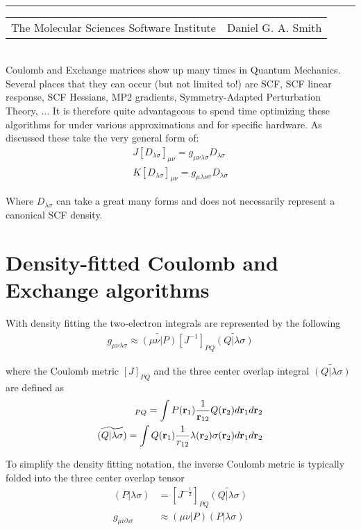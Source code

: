 \documentclass[aip,jcp,preprint,superscriptaddress,floatfix]{revtex4-1}
\renewcommand{\title}[1]{\textbf{\large{#1}}\\}
\newcommand{\leftright}[2]{\begin{tabularx}{\textwidth}{X>{\raggedleft}X}#1%
& #2\\\end{tabularx}\\[-1cm]}
\begin{document}
\title{}
\rule{\textwidth}{1pt}
\leftright{The Molecular Sciences Software Institute}{Daniel G. A. Smith} %

\bigskip
Coulomb and Exchange matrices show up many times in Quantum Mechanics. Several places that they can occur (but not limited to!) are SCF, SCF linear response, SCF Hessians, MP2 gradients, Symmetry-Adapted Perturbation Theory, ... It is therefore quite advantageous to spend time optimizing these algorithms for under various approximations and for specific hardware. As discussed these take the very general form of:
\begin{eqnarray}
J[D_{\lambda \sigma}]_{\mu \nu} =   g_{\mu \nu \lambda \sigma} D_{\lambda \sigma}\\
K[D_{\lambda \sigma}]_{\mu \nu} =   g_{\mu \lambda \nu \sigma} D_{\lambda \sigma} 
\end{eqnarray}

Where $D_{\lambda \sigma}$ can take a great many forms and does not necessarily represent a canonical SCF density.

\section{Density-fitted Coulomb and Exchange algorithms}

With density fitting\cite{Weigend:2002ga, Vahtras:1993db, Dunlap:1979gh, Whitten:1973ju} the two-electron integrals are represented by the following
\begin{eqnarray}
g_{\mu \nu \lambda \sigma} \approx \widetilde{(\mu \nu |P)} [J^{-1}]_{PQ} \widetilde{(Q| \lambda \sigma)}
\end{eqnarray}

where the Coulomb metric $[J]_{PQ}$ and the three center overlap integral $\widetilde{(Q| \lambda \sigma)} $ are defined as
\begin{eqnarray}
[J]_{PQ} = \int P({\bf r}_1) \frac{1}{{\bf r}_{12}}Q({\bf r}_2)d{\bf r}_1d{\bf r}_2\\
\widetilde{(Q| \lambda \sigma)} = \int Q({\bf r}_1)\frac{1}{r_{12}} \lambda({\bf r}_2) \sigma({\bf r}_2)d{\bf r}_1d{\bf r}_2
\end{eqnarray}

To simplify the density fitting notation, the inverse Coulomb metric is typically folded into the three center overlap tensor
\begin{align}
(P| \lambda \sigma) &= [J^{-\frac{1}{2}}]_{PQ} \widetilde{(Q| \lambda \sigma)}\\
g_{\mu \nu \lambda \sigma} &\approx (\mu \nu |P) (P| \lambda \sigma)
\end{align}
\end{document}
